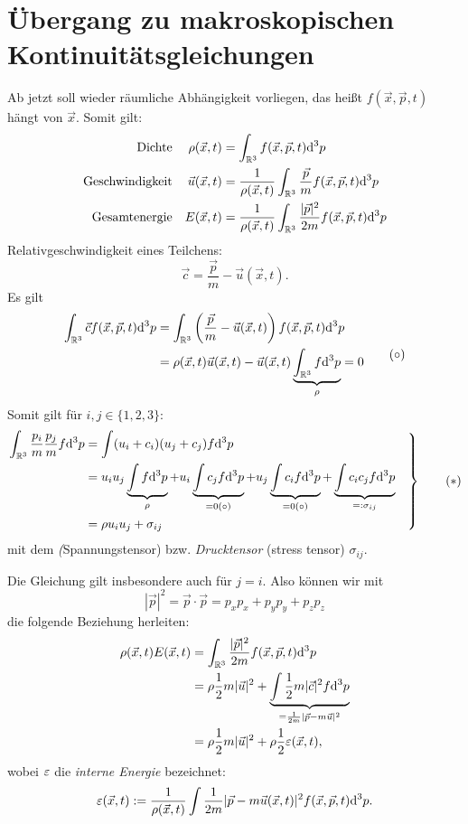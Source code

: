 \section{Übergang zu makroskopischen Kontinuitätsgleichungen}
Ab jetzt soll wieder räumliche Abhängigkeit vorliegen, das heißt $f(\vec{x},
\vec{p}, t)$ hängt von $\vec{x}$. Somit gilt:
\begin{align*}
  \text{Dichte}& & \rho( \vec{x}, t)
  &= \int_{\mathbb{R}^3} f(\vec{x}, \vec{p}, t) \mathrm{d}^3 p \\
  \text{Geschwindigkeit}& & \vec{u}(\vec{x}, t)
  &= \frac{1}{\rho(\vec{x}, t)} \int_{\mathbb{R}^3}
    \frac{\vec{p}}{m} f(\vec{x}, \vec{p}, t) \mathrm{d}^3 p \\
  \text{Gesamtenergie}& & E(\vec{x}, t)
  &= \frac{1}{\rho(\vec{x}, t)} \int_{\mathbb{R}^3}
    \frac{|\vec{p}|^2}{2m} f(\vec{x}, \vec{p}, t) \mathrm{d}^3 p
\end{align*}
Relativgeschwindigkeit eines Teilchens:
\[ \vec{c} = \frac{\vec{p}}{m} - \vec{u}(\vec{x},t). \]
Es gilt
\[ \begin{aligned}
    \int_{\mathbb{R}^3} \vec{c} f(\vec{x}, \vec{p}, t) \mathrm{d}^3 p
    &= \int_{\mathbb{R}^3} \left(\frac{\vec{p}}{m} - \vec{u}(\vec{x},t) \right)
    f(\vec{x}, \vec{p}, t) \mathrm{d}^3 p \\
    &= \rho(\vec{x}, t) \vec{u}(\vec{x},t)
    - \vec{u}(\vec{x},t)
    \underbrace{\int_{\mathbb{R}^3} f \mathrm{d}^3 p}_{\rho} = 0
  \end{aligned}
  \tag{$\circ$}
\]
Somit gilt für $i,j \in \{1,2,3\}$:
\[ \left. \begin{aligned}
  \int_{\mathbb{R}^3} \frac{p_i}{m} \frac{p_j}{m} f \mathrm{d}^3 p
  &= \int (u_i + c_i)(u_j + c_j) f \mathrm{d}^3 p \\
  &= u_i u_j \underbrace{\int f \mathrm{d}^3 p}_{\rho}
    + u_i \underbrace{\int c_j f \mathrm{d}^3 p }_{= 0 (\circ)}
    + u_j \underbrace{\int c_i f \mathrm{d}^3 p }_{= 0 (\circ)}
    + \underbrace{\int c_i c_j f \mathrm{d}^3 p }_{=: \sigma_{ij}} \\
  &= \rho u_i u_j + \sigma_{ij}
\end{aligned} \quad \right\} \tag{$\ast$} \]
mit dem \emph(Spannungstensor) bzw. \emph{Drucktensor} (stress tensor)
$\sigma_{ij}$.

Die Gleichung gilt insbesondere auch für $j=i$. Also können wir mit
\[ |\vec{p}|^2 = \vec{p} \cdot \vec{p} = p_x p_x + p_y p_y + p_z p_z \]
die folgende Beziehung herleiten:
\begin{align*}
  \rho(\vec{x}, t) E(\vec{x}, t)
  &= \int_{\mathbb{R}^3} \frac{|\vec{p}|^2}{2m} f(\vec{x}, \vec{p}, t) \mathrm{d}^3 p \\
  &= \rho \frac{1}{2} m |\vec{u}|^2 +
    \underbrace{\int \frac{1}{2} m |\vec{c}|^2
    f \mathrm{d}^3 p}_{=\frac{1}{2m}|\vec{p}-m \vec{u}|^2} \\
  &= \rho \frac{1}{2} m |\vec{u}|^2 + \rho \frac{1}{2} \varepsilon( \vec{x}, t ),
\end{align*}
wobei $\varepsilon$ die \emph{interne Energie} bezeichnet:
\[ \varepsilon( \vec{x}, t ) := \frac{1}{\rho(\vec{x},t)} \int \frac{1}{2m} |\vec{p} - m
  \vec{u}(\vec{x},t)|^2 f(\vec{x}, \vec{p}, t) \mathrm{d}^3 p. \]

